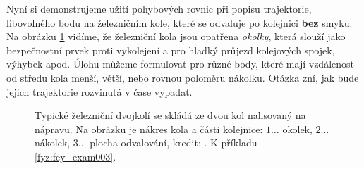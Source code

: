   
Nyní si demonstrujeme užití pohybových rovnic při popisu trajektorie, libovolného bodu na 
železničním kole, které se odvaluje po kolejnici \textbf{bez} smyku. Na obrázku \ref{fyz:fig0142} 
vidíme, že železniční kola jsou opatřena \emph{okolky}, která slouží jako bezpečnostní prvek proti 
vykolejení a pro hladký průjezd kolejových spojek, výhybek apod. Úlohu můžeme formulovat pro různé 
body, které mají vzdálenost od středu kola menší, větší, nebo rovnou poloměru nákolku. Otázka zní, 
jak bude jejich trajektorie rozvinutá v čase vypadat.

\begin{figure}[ht!]  %
  \centering
  \caption{Typické železniční dvojkolí se skládá ze dvou kol nalisovaný na nápravu. Na obrázku je
          nákres kola a části kolejnice: \(1\ldots\) okolek, \(2\ldots\) nákolek, \(3\ldots\) plocha
          odvalování, kredit: \wikiOkolek. K příkladu \ref{fyz:fey_exam003}.}
  \label{fyz:fig0142}
\end{figure}

